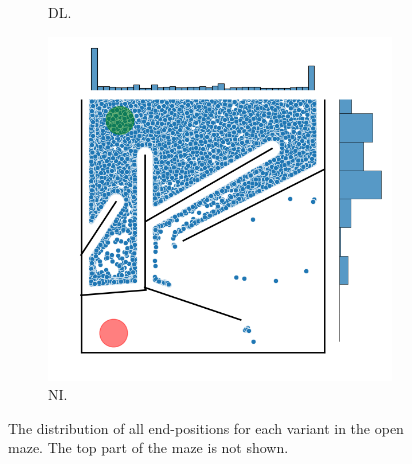 \begin{figure}[H]
\begin{mdframed}
\begin{subfigure}[b]{0.5\textwidth}
            \caption{DL.}
        \end{subfigure}
        \begin{subfigure}[b]{0.5\textwidth}
            \includegraphics[scale=0.4]{resources/mazes/novelty_injection_open_all_runs.png}
            \caption{NI.}
        \end{subfigure}
    \end{mdframed}
    \caption{The distribution of all end-positions for each variant in the open maze.
             The top part of the maze is not shown.}
    \label{distribution_open}
\end{figure}

